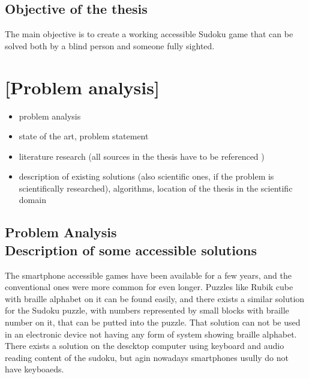 \documentclass[a4paper,twoside,12pt]{book}
\begin{document}
\section{Objective of the thesis}%

\par The main objective is to create a working accessible Sudoku game that can be solved both by a blind person and someone fully sighted.

\chapter{[Problem analysis]}



\begin{itemize}
\item  problem analysis
\item state of the art, problem statement
\item  literature research (all sources in the thesis have to be referenced \cite{bib:article,bib:book,bib:conference,bib:internet})
\item description of existing solutions (also scientific ones, if the problem is scientifically researched), algorithms,  location of the thesis in the scientific domain
\end{itemize}

\clearpage

\section {Problem Analysis\\{\large Description of some accessible solutions}}

\par
The smartphone accessible games have been available for a few years, and the conventional ones were more common for even longer. Puzzles like Rubik cube with braille alphabet on it can be found easily, and there exists a similar solution for the Sudoku puzzle, with numbers represented by small blocks with braille number on it, that can be putted into the puzzle. That solution can not be used in an electronic device not having any form of system showing braille alphabet. There exists a solution on the descktop computer using keyboard and audio reading content of the sudoku, but agin nowadays smartphones usully do not have keyboaeds. 
\end{document}
